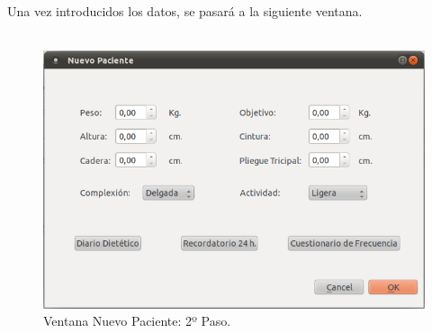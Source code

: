 \begin{enumerate}
Una vez introducidos los datos, se pasará a la siguiente ventana.\\\\
\begin{figure}[H]
  \label{nuevo_paciente2}
  \begin{center}
    \includegraphics[scale=0.5]{../../Image/paciente-nuevo2.png}
  \end{center}
  \caption{Ventana Nuevo Paciente: 2º Paso.}
\end{figure}


\end{enumerate}
